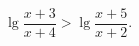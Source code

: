 \begin{ex}[type=inequality]
	\begin{condition}
		$\lg \dfrac{x + 3}{x + 4}>\lg \dfrac{x + 5}{x + 2}  .$
	\end{condition}
\end{ex}